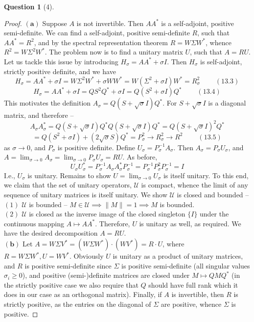 \documentclass[11pt]{article}
\theoremstyle{quest}
\newtheorem*{question}{Question}
\begin{document}
\begin{question}[4]
\end{question}
\begin{proof}
$\mathbf{(a)}$ Suppose $A$ is not invertible. Then $AA^*$ is a self-adjoint, positive semi-definite. We can find a self-adjoint, positive semi-definite $R$, such that $AA^* = R^2$, and by the spectral representation theorem $R = W\Sigma W^*$, whence $R^2 = W\Sigma^2 W^*$. The problem now is to find a unitary matrix $U$, such that $A = RU$. Let us tackle this issue by introducing $H_{\sigma} = AA^* + \sigma I$. Then $H_{\sigma}$ is self-adjoint, strictly positive definite, and we have
$$H_{\sigma} = AA^* + \sigma I = W\Sigma^2 W^* + \sigma WW^* = W(\Sigma^2 + \sigma I)W^* = R_{\sigma}^2\ \ \ \ \ \ \ \ \ \ (13.3)$$
$$H_{\sigma} = AA^* + \sigma I = QS^2Q^* + \sigma I = Q(S^2 + \sigma I)Q^*\ \ \ \ \ \ \ \ \ \ (13.4)$$
This motivates the definition $A_{\sigma} = Q(S + \sqrt{\sigma} I)Q^*$. For $S + \sqrt{\sigma} I$ is a diagonal matrix, and therefore --
$$A_{\sigma}A_{\sigma}^* = Q(S + \sqrt{\sigma} I)Q^* Q(S + \sqrt{\sigma} I)Q^* = Q(S + \sqrt{\sigma} I)^2Q^*$$
$$= Q(S^2 + \sigma I) + (2\sqrt{\sigma}S)Q^* = P_{\sigma}^2 \rightarrow R_{\sigma}^2 \rightarrow R^2\ \ \ \ \ \ \ \ \ \ (13.5)$$
as $\sigma \rightarrow 0$, and $P_{\sigma}$ is positive definite. Define $U_{\sigma} = P_{\sigma}^{-1}A_{\sigma}$. Then $A_{\sigma} = P_{\sigma}U_{\sigma}$, and $A = \lim_{\sigma \rightarrow 0} A_{\sigma} = \lim_{\sigma \rightarrow 0} P_{\sigma}U_{\sigma} = RU$. As before,
$$U_{\sigma} U_{\sigma}^* = P_{\sigma}^{-1}A_{\sigma} A_{\sigma}^* P_{\sigma}^{-1} = P_{\sigma}^{-1}P_{\sigma}^2 P_{\sigma}^{-1} = I$$
I.e., $U_{\sigma}$ is unitary. Remains to show $U = \lim_{\sigma \rightarrow 0}U_{\sigma}$ is itself unitary. To this end, we claim that the set of unitary operators, $\mathscr{U}$ is compact, whence the limit of any sequence of unitary matrices is itself unitary. We show $\mathscr{U}$ is closed and bounded --
\\$(1)$ $\mathscr{U}$ is bounded -- $M \in \mathscr{U} \implies \|M\| = 1 \implies M$ is bounded.
\\$(2)$ $\mathscr{U}$ is closed as the inverse image of the closed singleton $\{I\}$ under the continuous mapping $A \mapsto AA^*$.
Therefore, $U$ is unitary as well, as required. We have the desired decomposition $A = RU$.
\\$\mathbf{(b)}$ Let $A = W\Sigma V^* = (W \Sigma W^*) \cdot (WV^*) = R \cdot U$, where $R = W \Sigma W^*, U = WV^*$. Obviously $U$ is unitary as a product of unitary matrices, and $R$ is positive semi-definite since $\Sigma$ is positive semi-definite (all singular values $\sigma_i \ge 0$), and positive (semi-)definite matrices are closed under $M \mapsto QMQ^*$ (in the strictly positive case we also require that $Q$ should have full rank which it does in our case as an orthogonal matrix). Finally, if $A$ is invertible, then $R$ is strictly positive, as the entries on the diagonal of $\Sigma$ are positive, whence $\Sigma$ is positive.
\end{proof}
\end{document}

